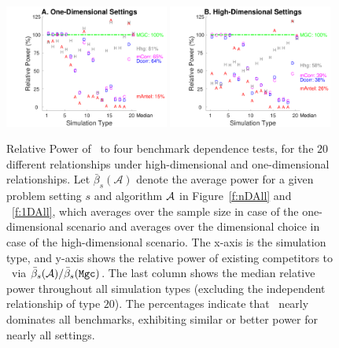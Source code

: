 \documentclass[11pt]{extarticle}
\begin{document}
\begin{figure}[!ht]
\centering
\includegraphics[width=0.48\textwidth,trim={1.5cm 0 0cm 0cm},clip]{Figures/Fig1DPowerSummary}
\includegraphics[width=0.48\textwidth,trim={1.5cm 0 0cm 0cm},clip]{Figures/FigHDPowerSummary}
  \caption{Relative Power of  \Mgc~to four benchmark dependence tests, for the $20$ different relationships under high-dimensional and one-dimensional relationships.
Let $\bar{\beta}_s(\mathcal{A})$ denote the average power for a given problem setting $s$ and algorithm $\mathcal{A}$ in Figure~\ref{f:nDAll} and ~\ref{f:1DAll}, which averages over the sample size in case of the one-dimensional scenario and averages over the dimensional choice in case of the high-dimensional scenario. The x-axis is the simulation type, and y-axis shows the relative power of existing competitors to \Mgc~via $\bar{\beta}_s(\mathcal{A}) / \bar{\beta}_s({\sc \texttt{Mgc}})$. The last column shows the median relative power throughout all simulation types (excluding the independent relationship of type $20$). The percentages indicate that \Mgc~nearly dominates all benchmarks, exhibiting similar or better power for nearly all settings.
}
\label{f:Summary2}
\end{figure}
\end{document}
